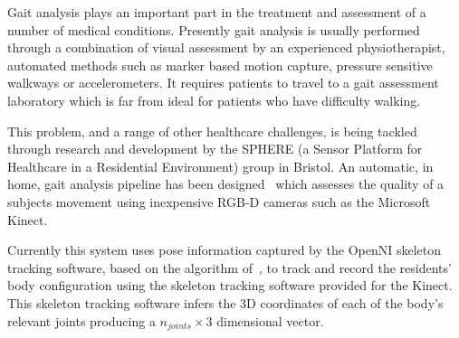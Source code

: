 \documentclass[11pt]{article} %
\begin{document}

Gait analysis plays an important part in the treatment and assessment of a number of medical conditions. Presently gait analysis is usually performed through a combination of visual assessment by an experienced physiotherapist, automated methods such as marker based motion capture, pressure sensitive walkways or accelerometers. It requires patients to travel to a gait assessment laboratory which is far from ideal for patients who have difficulty walking. 

This problem, and a range of other healthcare challenges, is being tackled through research and development by the SPHERE (a Sensor Platform for Healthcare in a Residential Environment) group in Bristol. An automatic, in home, gait analysis pipeline has been designed~\cite{Paiement} which assesses the quality of a subjects movement using inexpensive RGB-D cameras such as the Microsoft Kinect.

Currently this system uses pose information captured by the OpenNI skeleton tracking software, based on the algorithm of~\cite{Shotton2011}, to track and record the residents' body configuration using the skeleton tracking software provided for the Kinect. This skeleton tracking software infers the 3D coordinates of each of the body's relevant joints producing a $n_{joints} \times 3$ dimensional vector. 
\end{document}
